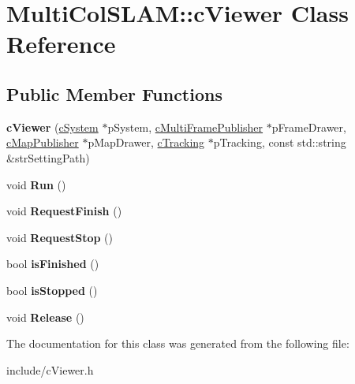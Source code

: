 \hypertarget{classMultiColSLAM_1_1cViewer}{}\section{Multi\+Col\+S\+L\+AM\+:\+:c\+Viewer Class Reference}
\label{classMultiColSLAM_1_1cViewer}
\subsection*{Public Member Functions}
\begin{DoxyCompactItemize}
\item 
{\bfseries c\+Viewer} (\hyperlink{classMultiColSLAM_1_1cSystem}{c\+System} $\ast$p\+System, \hyperlink{classMultiColSLAM_1_1cMultiFramePublisher}{c\+Multi\+Frame\+Publisher} $\ast$p\+Frame\+Drawer, \hyperlink{classMultiColSLAM_1_1cMapPublisher}{c\+Map\+Publisher} $\ast$p\+Map\+Drawer, \hyperlink{classMultiColSLAM_1_1cTracking}{c\+Tracking} $\ast$p\+Tracking, const std\+::string \&str\+Setting\+Path)\hypertarget{classMultiColSLAM_1_1cViewer_ab775bc4905c25da22078bd9471d4cbc9}{}\label{classMultiColSLAM_1_1cViewer_ab775bc4905c25da22078bd9471d4cbc9}

\item 
void {\bfseries Run} ()\hypertarget{classMultiColSLAM_1_1cViewer_ac86bb592698b8560e7477f1dbf30ddf7}{}\label{classMultiColSLAM_1_1cViewer_ac86bb592698b8560e7477f1dbf30ddf7}

\item 
void {\bfseries Request\+Finish} ()\hypertarget{classMultiColSLAM_1_1cViewer_ae29fa029727f82adefa63f4ad981124d}{}\label{classMultiColSLAM_1_1cViewer_ae29fa029727f82adefa63f4ad981124d}

\item 
void {\bfseries Request\+Stop} ()\hypertarget{classMultiColSLAM_1_1cViewer_aaf3cf818de40853730e881e6cb77e33f}{}\label{classMultiColSLAM_1_1cViewer_aaf3cf818de40853730e881e6cb77e33f}

\item 
bool {\bfseries is\+Finished} ()\hypertarget{classMultiColSLAM_1_1cViewer_ae9c15b03cbe9055fab0047d58b6ba938}{}\label{classMultiColSLAM_1_1cViewer_ae9c15b03cbe9055fab0047d58b6ba938}

\item 
bool {\bfseries is\+Stopped} ()\hypertarget{classMultiColSLAM_1_1cViewer_aad8b3d231780aa6abcaf538e416a0b15}{}\label{classMultiColSLAM_1_1cViewer_aad8b3d231780aa6abcaf538e416a0b15}

\item 
void {\bfseries Release} ()\hypertarget{classMultiColSLAM_1_1cViewer_aab81828f24d5353f4ede9422868190e0}{}\label{classMultiColSLAM_1_1cViewer_aab81828f24d5353f4ede9422868190e0}

\end{DoxyCompactItemize}


The documentation for this class was generated from the following file\+:\begin{DoxyCompactItemize}
\item 
include/c\+Viewer.\+h\end{DoxyCompactItemize}
